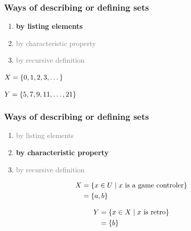 \documentclass[fleqn,10pt,serif,xcolor=svgnames,xcolor=table,aspectratio=169,handout]{beamer}
\newcommand{\mygray}[1]{\textcolor{gray}{#1}}
\begin{document}
\begin{frame}

  \frametitle{Ways of describing or defining sets}

  \begin{minipage}{0.4\linewidth}
    \begin{enumerate}
      \item \textbf{by listing elements}
      \item \mygray{by characteristic property}
      \item \mygray{by recursive definition}
    \end{enumerate}
  \end{minipage}
  \hfill
  \begin{minipage}{0.45\linewidth}

    $X = \left\{0, 1, 2, 3, \dots\right\}$

\bigskip

    $Y = \left\{5, 7, 9, 11, \dots, 21\right\}$
  \end{minipage}

\end{frame}


\begin{frame}

  \frametitle{Ways of describing or defining sets}

  \begin{minipage}{0.4\linewidth}
    \begin{enumerate}
      \item \mygray{by listing elements}
      \item \textbf{by characteristic property}
      \item \mygray{by recursive definition}
    \end{enumerate}
  \end{minipage}
  \hfill
  \begin{minipage}{0.45\linewidth}

    \begin{align*}
      X & = \left\{x \in U \mid x \text{ is a game controler}\right\} \\
      & = \left\{a,b\right\}
    \end{align*}

\bigskip

\begin{align*}
  Y &= \left\{x \in X \mid x \text{ is retro}\right\} \\
  & = \left\{b\right\}
\end{align*}
  \end{minipage}

\end{frame}
\end{document}
